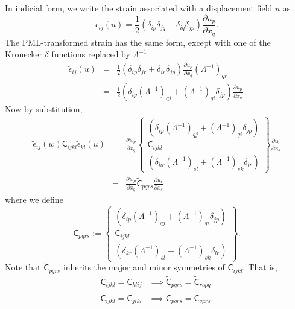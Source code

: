 \documentclass{article}
\newcommand{\sfC}{\mathsf{C}}
\newcommand{\Lambdaip}{\left( \Lambda^{-1} \right)}
\begin{document}
In indicial form, we write the strain associated with a displacement
field $u$ as
\begin{equation}
  \epsilon_{ij}(u) = 
    \frac{1}{2} \left( \delta_{ip} \delta_{jq} + 
                       \delta_{iq} \delta_{jp} \right)
    \frac{\partial u_p}{\partial x_q}.
\end{equation}
The PML-transformed strain has the same form, except with one of
the Kronecker $\delta$ functions replaced by $\Lambda^{-1}$:
\begin{eqnarray}
  \tilde{\epsilon}_{ij}(u) 
  & = &
    \frac{1}{2} \left( \delta_{ip} \delta_{jr} + 
                       \delta_{ir} \delta_{jp} \right)
    \frac{\partial u_p}{\partial x_q} \Lambdaip_{qr} \\
  & = &
    \frac{1}{2} \left( \delta_{ip} \Lambdaip_{qj} + 
                       \Lambdaip_{qi} \delta_{jp} \right)
    \frac{\partial u_p}{\partial x_q}.
\end{eqnarray}
Now by substitution,
\begin{eqnarray}
  \tilde{\epsilon}_{ij}(w) \sfC_{ijkl} \tilde{\epsilon}_{kl}(u) 
  & = &
    \frac{\partial w_p}{\partial x_q}
    \left\{
      \begin{array}{c}
      \left( \delta_{ip} \Lambdaip_{qj} +
             \Lambdaip_{qi} \delta_{jp} \right)  \\
      \sfC_{ijkl} \\
      \left( \delta_{kr} \Lambdaip_{sl} +
             \Lambdaip_{sk} \delta_{lr} \right) 
      \end{array}
    \right\}
    \frac{\partial u_r}{\partial x_s} \\
  & = &
    \frac{\partial w_p}{\partial x_q}
    \tilde{\sfC}_{pqrs}
    \frac{\partial u_r}{\partial x_s}
  \label{transform-C-step-1}
\end{eqnarray}
where we define
\begin{equation}
  \tilde{\sfC}_{pqrs} :=
    \left\{
      \begin{array}{c}
      \left( \delta_{ip} \Lambdaip_{qj} +
             \Lambdaip_{qi} \delta_{jp} \right)  \\
      \sfC_{ijkl} \\
      \left( \delta_{kr} \Lambdaip_{sl} +
             \Lambdaip_{sk} \delta_{lr} \right) 
      \end{array}
    \right\}.
\end{equation}
Note that $\tilde{\sfC}_{pqrs}$ inherits the major and minor symmetries
of $\sfC_{ijkl}$.  That is,
\begin{eqnarray}
  \sfC_{ijkl} = \sfC_{klij} & \implies
  \tilde{\sfC}_{pqrs} = \tilde{\sfC}_{rspq} \\
  \sfC_{ijkl} = \sfC_{jikl} & \implies
  \tilde{\sfC}_{pqrs} = \tilde{\sfC}_{qprs}.
\end{eqnarray}
\end{document}
